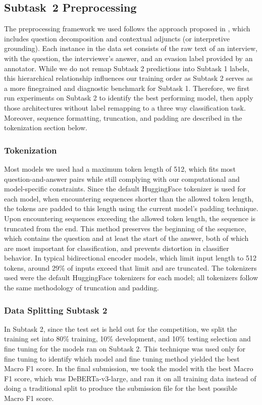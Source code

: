 \documentclass[11pt]{article}
\begin{document}
\subsection{Subtask~2 Preprocessing}
The preprocessing framework we used follows the approach proposed in \citet{thomas2024isaidthatdataset}, which includes question decomposition and contextual adjuncts (or interpretive grounding). Each instance in the data set consists of the raw text of an interview, with the question, the interviewer’s answer, and an evasion label provided by an annotator. While we do not remap Subtask 2 predictions into Subtask 1 labels, this hierarchical relationship influences our training order as Subtask 2 serves as a more finegrained and diagnostic benchmark for Subtask 1. Therefore, we first run experiments on Subtask 2 to identify the best performing model, then apply those architectures without label remapping to a three way classification task. Moreover, sequence formatting, truncation, and padding are described in the tokenization section below.


\subsubsection{Tokenization}
Most models we used had a maximum token length of 512, which fits most question-and-answer pairs while still complying with our computational and model-specific constraints. Since the default HuggingFace tokenizer is used for each model, when encountering sequences shorter than the allowed token length, the tokens are padded to this length using the current model's padding technique. Upon encountering sequences exceeding the allowed token length, the sequence is truncated from the end. This method preserves the beginning of the sequence, which contains the question and at least the start of the answer, both of which are most important for classification, and prevents distortion in classifier behavior. In typical bidirectional encoder models, which limit input length to 512 tokens, around 29\% of inputs exceed that limit and are truncated. The tokenizers used were the default HuggingFace tokenizers for each model; all tokenizers follow the same methodology of truncation and padding.

\subsubsection{Data Splitting Subtask 2}
In Subtask 2, since the test set is held out for the competition, we split the training set into 80\% training, 10\% development, and 10\% testing selection and fine tuning for the models ran on Subtask 2. This technique was used only for fine tuning to identify which model and fine tuning method yielded the best Macro F1 score. In the final submission, we took the model with the best Macro F1 score, which was DeBERTa-v3-large, and ran it on all training data instead of doing a traditional split to produce the submission file for the best possible Macro F1 score.
\end{document}
